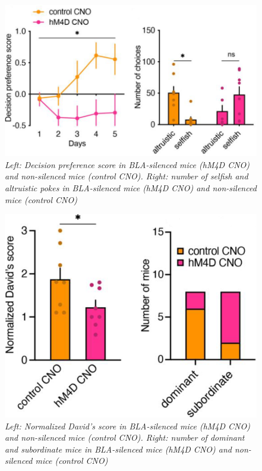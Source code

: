 \documentclass[12pt, a4paper]{report}
\begin{document}
\begin{figure}[H]
	\begin{center}
		\includegraphics[scale=0.6]{silencing.png} 
	\end{center} 
	\caption{\textit{Left: Decision preference score in BLA-silenced mice (hM4D CNO) and non-silenced mice (control CNO). Right: number of selfish and altruistic pokes in BLA-silenced mice (hM4D CNO) and non-silenced mice (control CNO) }} \label{silencing}
	
\end{figure}


\begin{figure}[H]
	\begin{center}
		\includegraphics[scale=0.6]{sil_dom.png} 
	\end{center} 
	\caption{\textit{Left: Normalized David's score in BLA-silenced mice (hM4D CNO) and non-silenced mice (control CNO). Right: number of dominant and subordinate mice in BLA-silenced mice (hM4D CNO) and non-silenced mice (control CNO) }} \label{sil_dom}
	
\end{figure}
\end{document}
